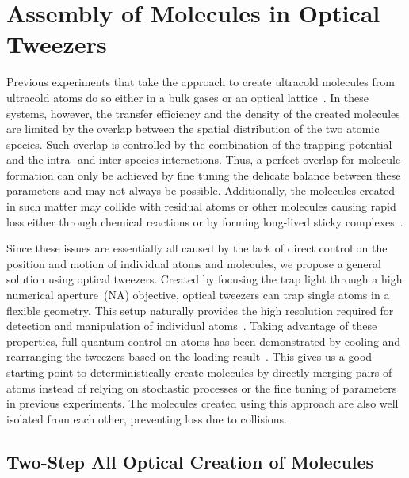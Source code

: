 \section{Assembly of Molecules in Optical Tweezers}
\label{ch:introduction:tweezers}

Previous experiments that take the approach to create ultracold molecules
from ultracold atoms do so either in a bulk gases
or an optical lattice~\cite{moses_creation_2015}.
In these systems, however, the transfer efficiency and
the density of the created molecules are limited
by the overlap between the spatial distribution of the two atomic species.
Such overlap is controlled by the combination of the trapping potential
and the intra- and inter-species interactions.
Thus, a perfect overlap for molecule formation can only be achieved by fine tuning
the delicate balance between these parameters and may not always be possible.
Additionally, the molecules created in such matter may collide
with residual atoms or other molecules causing rapid loss
either through chemical reactions or by forming long-lived sticky complexes~\cite{
  mayle_scattering_2013,croft_long-lived_2014,liu_photo-excitation_2020}.

Since these issues are essentially all caused by the lack of direct control
on the position and motion of individual atoms and molecules,
we propose a general solution using optical tweezers.
Created by focusing the trap light through a high numerical aperture~(NA) objective,
optical tweezers can trap single atoms in a flexible geometry.
This setup naturally provides the high resolution required
for detection and manipulation of individual atoms~\cite{schlosser_sub-poissonian_2001}.
Taking advantage of these properties, full quantum control on atoms has been demonstrated
by cooling and rearranging the tweezers based on the loading result~\cite{
  barredo_atom-by-atom_2016,endres_atom-by-atom_2016}.
This gives us a good starting point to deterministically create molecules
by directly merging pairs of atoms instead of
relying on stochastic processes or the fine tuning of parameters in previous experiments.
The molecules created using this approach are also well isolated from each other,
preventing loss due to collisions.

\subsection{Two-Step All Optical Creation of Molecules}
\label{ch:introduction:tweezers:two-step}

